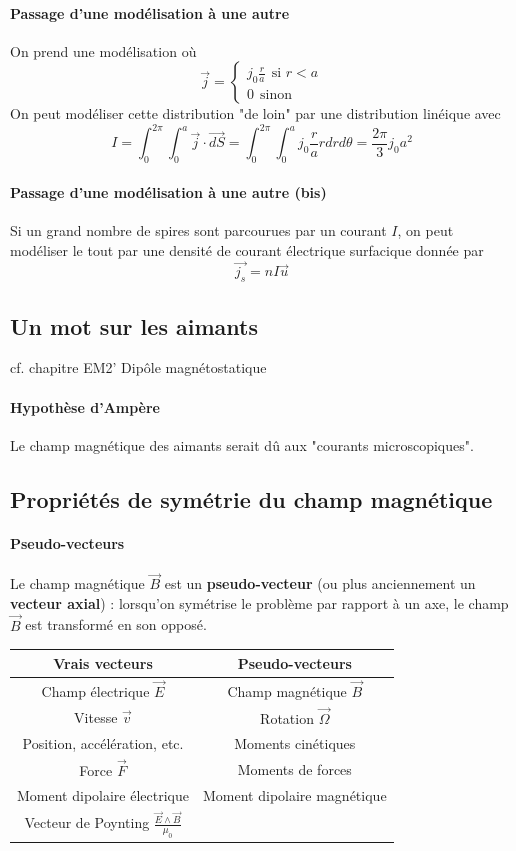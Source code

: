 \documentclass[french]{book}
\theoremstyle{plain}
\theoremstyle{definition}
\theoremstyle{remark}
\begin{document}
\paragraph{Passage d'une modélisation à une autre} On prend une modélisation où $$\overrightarrow{j}=\begin{cases}
	\displaystyle j_0\frac{r}{a} \ \ \text{si }r<a \\
	0 \ \ \text{sinon}
\end{cases}$$ On peut modéliser cette distribution "de loin" par une distribution linéique avec $$I=\int_{0}^{2\pi}\int_{0}^{a}\overrightarrow{j}\cdot\overrightarrow{dS}=\int_{0}^{2\pi}\int_{0}^{a}j_0\frac{r}{a}rdrd\theta=\frac{2\pi}{3}j_0a^2$$
\paragraph{Passage d'une modélisation à une autre (bis)}
Si un grand nombre de spires sont parcourues par un courant $I$, on peut modéliser le tout par une densité de courant électrique surfacique donnée par $$\overrightarrow{j_s}=nI\overrightarrow{u}$$
\subsection{Un mot sur les aimants}
cf. chapitre EM2' Dipôle magnétostatique
\paragraph{Hypothèse d'Ampère} Le champ magnétique des aimants serait dû aux "courants microscopiques".
\subsection{Propriétés de symétrie du champ magnétique}
\paragraph{Pseudo-vecteurs} Le champ magnétique $\overrightarrow{B}$ est un \textbf{pseudo-vecteur} (ou plus anciennement un \textbf{vecteur axial}) : lorsqu'on symétrise le problème par rapport à un axe, le champ $\overrightarrow{B}$ est transformé en son opposé.
\begin{center}
	\begin{tabular}{|c|c|}
		\hline
		\textbf{Vrais vecteurs}&\textbf{Pseudo-vecteurs} \\
		\hline
		Champ électrique $\overrightarrow{E}$ & Champ magnétique $\overrightarrow{B}$ \\
		\hline
		Vitesse $\overrightarrow{v}$ & Rotation $\overrightarrow{\Omega}$\\
		\hline
		Position, accélération, etc.& Moments cinétiques \\
		\hline
		Force $\overrightarrow{F}$ & Moments de forces \\
		\hline
		Moment dipolaire électrique&Moment dipolaire magnétique \\
		\hline 
		Vecteur de Poynting $\displaystyle\frac{\overrightarrow{E}\wedge\overrightarrow{B}}{\mu_0}$ & \\
		\hline
	\end{tabular}
\end{center}
\end{document}
